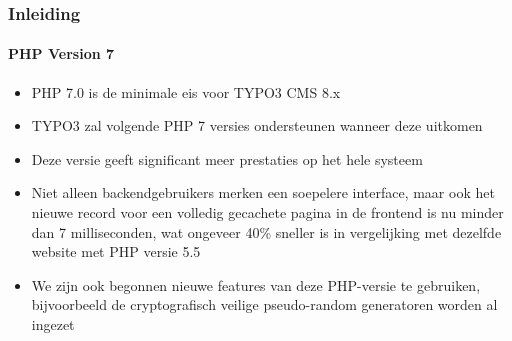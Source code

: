 \begin{frame}[fragile]
	\frametitle{Inleiding}
	\framesubtitle{PHP Version 7}

	\begin{itemize}

		\item PHP 7.0 is de minimale eis voor TYPO3 CMS 8.x
		\item TYPO3 zal volgende PHP 7 versies ondersteunen wanneer deze uitkomen
		\item Deze versie geeft significant meer prestaties op het hele systeem

		\item Niet alleen backendgebruikers merken een soepelere interface, maar ook het
			nieuwe record voor een volledig gecachete pagina in de frontend is nu minder
			dan 7 milliseconden, wat ongeveer 40\% sneller is in vergelijking met dezelfde
			website met PHP versie 5.5

		\item We zijn ook begonnen nieuwe features van deze PHP-versie te gebruiken, bijvoorbeeld
			de cryptografisch veilige pseudo-random generatoren worden al ingezet

	\end{itemize}

\end{frame}

